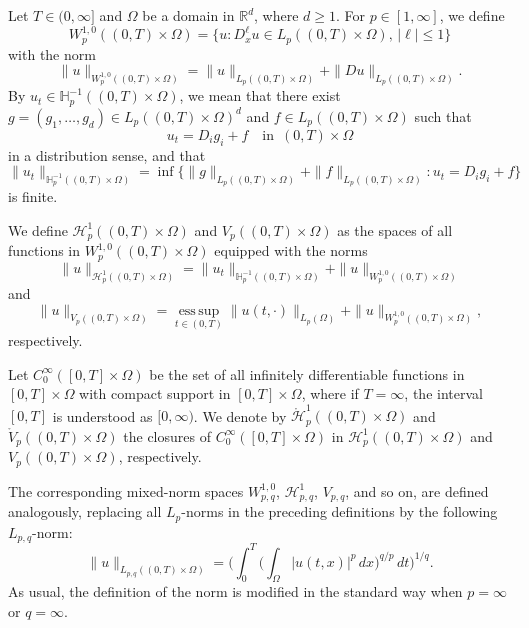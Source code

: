 \documentclass[reqno]{amsart}
\numberwithin{equation}{section}
\theoremstyle{plain}
\theoremstyle{definition}
\def\bR{\mathbb{R}}
\def\bH{\mathbb{H}}
\def\cH{\mathcal{H}}
\begin{document}
Let $T\in (0, \infty]$ and $\Omega$ be a domain in $\bR^d$, where $d\ge 1$.
For $p\in [1, \infty]$, we define 
$$
W^{1,0}_p((0,T)\times \Omega)=\{u: D^\ell_x u\in L_p((0,T)\times \Omega), \, |\ell|\le 1 \}
$$
with the norm
$$
\|u\|_{W^{1,0}_p((0,T)\times \Omega)}=\|u\|_{L_p((0,T)\times \Omega)}+\|Du\|_{L_p((0,T)\times \Omega)}.
$$
By $u_t\in \bH^{-1}_p((0,T)\times \Omega)$, we mean that there exist $g=(g_1,\ldots, g_d)\in L_p((0,T)\times \Omega)^d$ and $f\in L_{p}((0,T)\times \Omega)$ such that 
$$
u_t=D_i g_i+f \quad \text{in }\, (0,T)\times \Omega
$$
in a distribution sense, and that
$$
\|u_t\|_{\bH^{-1}_{p}((0,T)\times \Omega)}=\inf\big\{\|g\|_{L_{p}((0,T)\times \Omega)}+\|f\|_{L_{p}((0,T)\times \Omega)}: u_t=D_i g_i+f\big\}
$$
is finite.

We define $\cH^1_p((0,T)\times \Omega)$ and $V_p((0,T)\times \Omega)$ as the spaces of all functions in $W^{1,0}_{p}((0,T)\times \Omega)$ equipped with the norms
$$
\|u\|_{\cH^1_{p}((0,T)\times \Omega)}=\|u_t\|_{\bH^{-1}_{p}((0,T)\times \Omega)}+\|u\|_{W^{1,0}_p((0,T)\times \Omega)}
$$
and 
$$
\|u\|_{V_p((0,T)\times \Omega)}=\operatorname*{ess\,sup}_{t\in (0, T)} \|u(t, \cdot)\|_{L_p(\Omega)}+\|u\|_{W^{1,0}_{p}((0,T)\times \Omega)},
$$
respectively.

Let $C^\infty_0([0,T]\times \Omega)$ be the set of all infinitely differentiable functions in $[0,T]\times \Omega$ with compact support in $[0,T]\times \Omega$,
where if  $T=\infty$, the interval $[0, T]$ is understood as $[0, \infty)$.
We denote by $\mathring{\cH}^1_p((0,T)\times \Omega)$ and $\mathring{V}_p((0,T)\times \Omega)$ the closures of $C^\infty_0([0,T]\times \Omega)$ in $\cH^1_p((0,T)\times \Omega)$ and $V_p((0,T)\times \Omega)$, respectively.

The corresponding mixed-norm spaces $W^{1,0}_{p,q}$, $\cH^1_{p,q}$, $V_{p,q}$, and so on, are defined analogously, replacing all $L_p$-norms in the preceding definitions by the following $L_{p,q}$-norm:
$$
\|u\|_{L_{p,q}((0,T)\times \Omega)}=\bigg(\int_0^T \bigg(\int_{\Omega}|u(t,x)|^p\,dx\bigg)^{q/p}\,dt\bigg)^{1/q}.
$$
As usual, the definition of the norm is modified in the standard way when $p=\infty$ or $q=\infty$.
\end{document}

